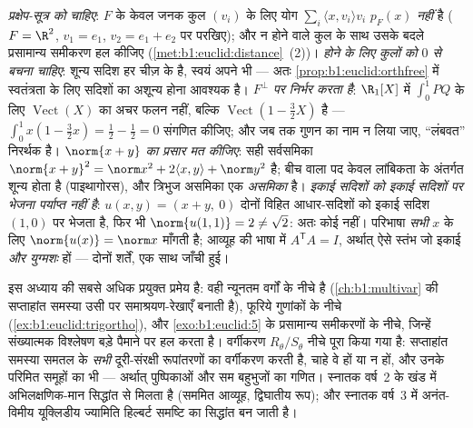 \begin{remark}[सामान्य भूलें]
\label{rem:b1:euclid:pitfalls}
\emph{प्रक्षेप-सूत्र को   चाहिए}: $F$ के केवल जनक कुल
$(v_i)$ के लिए योग $\sum_i\langle x, v_i\rangle v_i$ $p_F(x)$ \emph{नहीं} है
($F = \R^2$, $v_1 = e_1$, $v_2 = e_1 + e_2$ पर परखिए); और 
न होने वाले कुल के साथ उसके बदले प्रसामान्य समीकरण हल कीजिए
(\cref{met:b1:euclid:distance}~(2))। \emph{ होने के लिए  कुलों
को $0$ से बचना चाहिए}: शून्य सदिश हर चीज़ के  है, स्वयं अपने भी ---
अतः \cref{prop:b1:euclid:orthfree} में स्वतंत्रता के लिए सदिशों का अशून्य
होना आवश्यक है। \emph{$F^\perp$  पर निर्भर करता है}: $\R_1[X]$ में
$\int_0^1 PQ$ के लिए $\operatorname{Vect}(X)$ का  अचर फलन नहीं, बल्कि
$\operatorname{Vect}(1 - \frac32 X)$ है --- $\int_0^1 x(1 - \frac32 x) =
\frac12 - \frac12 = 0$ संगणित कीजिए; और जब तक गुणन का नाम न लिया जाए,
``लंबवत'' निरर्थक है। \emph{$\norm{x + y}$ का  प्रसार मत कीजिए}: सही
सर्वसमिका $\norm{x+y}^2 = \norm x^2 + 2\langle x, y\rangle + \norm y^2$ है;
बीच वाला पद केवल लांबिकता के अंतर्गत शून्य होता है (पाइथागोरस), और त्रिभुज
असमिका एक \emph{असमिका} है। \emph{इकाई सदिशों को इकाई सदिशों पर भेजना
पर्याप्त नहीं है}: $u(x, y) = (x + y,\ 0)$ दोनों विहित आधार-सदिशों को इकाई
सदिश $(1, 0)$ पर भेजता है, फिर भी $\norm{u(1,1)} = 2 \neq \sqrt2$: अतः कोई
 नहीं। परिभाषा \emph{सभी} $x$ के लिए $\norm{u(x)} = \norm x$ माँगती
है; आव्यूह की भाषा में $A^{\mathsf T}A = I$, अर्थात् ऐसे स्तंभ जो इकाई
\emph{और युग्मशः } हों --- दोनों शर्तें, एक साथ जाँची हुई।
\end{remark}

\begin{remark}[अंतर्गुणन कहाँ जाता है]
\label{rem:b1:euclid:whereused}
 इस अध्याय की सबसे अधिक प्रयुक्त प्रमेय है: वही न्यूनतम
वर्गों के नीचे है (\cref{ch:b1:multivar} की सप्ताहांत समस्या उसी पर
समाश्रयण-रेखाएँ बनाती है), फूरिये गुणांकों के नीचे
(\cref{ex:b1:euclid:trigortho}), और \cref{exo:b1:euclid:5} के प्रसामान्य
समीकरणों के नीचे, जिन्हें संख्यात्मक विश्लेषण बड़े पैमाने पर हल करता है।
वर्गीकरण $R_\theta / S_\theta$ नीचे पूरा किया गया है: सप्ताहांत समस्या समतल
के \emph{सभी} दूरी-संरक्षी रूपांतरणों का वर्गीकरण करती है, चाहे वे  हों
या न हों, और उनके परिमित समूहों का भी --- अर्थात् पुष्पिकाओं और सम बहुभुजों
का गणित। स्नातक वर्ष~2 के खंड में  अभिलक्षणिक-मान सिद्धांत से मिलता
है (सममित आव्यूह, द्विघातीय रूप); और स्नातक वर्ष~3 में अनंत-विमीय यूक्लिडीय
ज्यामिति हिल्बर्ट समष्टि का सिद्धांत बन जाती है।
\end{remark}

